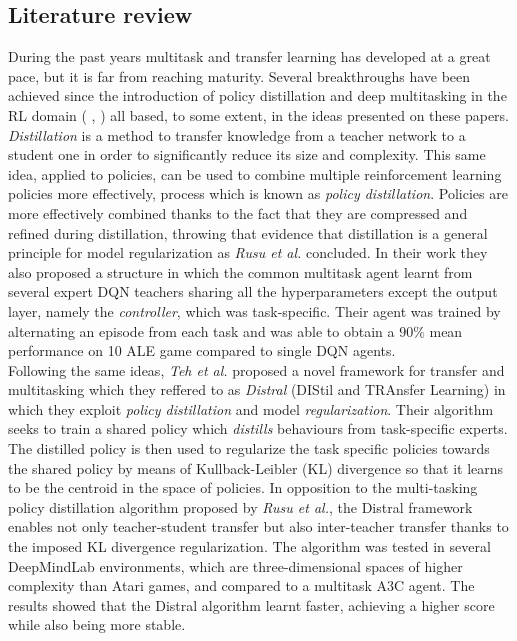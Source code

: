 \documentclass{article}
\begin{document}
\subsection{Literature review}
During the past years multitask and transfer learning has developed at a great pace, but it is far from reaching maturity. Several breakthroughs have been achieved since the introduction of policy distillation and deep multitasking in the RL domain ( \citep{RusuPOLICYDISTILLATION}, \citep{Parisotto2015Actor-Mimic:Learning})  all based, to some extent, in the ideas presented on these papers.\\
\newline
\textit{Distillation} is a method to transfer knowledge from a teacher network to a student one \citep{RusuPOLICYDISTILLATION} in order to significantly reduce its size and complexity. This same idea, applied to policies, can be used to combine multiple reinforcement learning policies more effectively, process which is known as \textit{policy distillation}. Policies are more effectively combined thanks to the fact that they are compressed and refined during distillation, throwing that evidence that distillation is a general principle for model regularization as \textit{Rusu et al.} concluded. In their work they also proposed a structure in which the common multitask agent learnt from several expert DQN teachers sharing all the hyperparameters except the output layer, namely the \textit{controller}, which was task-specific. Their agent was trained by alternating an episode from each task and was able to obtain a $90\%$ mean performance on 10 ALE game compared to single DQN agents.\\
\newline
Following the same ideas, \textit{Teh et al.} \citep{Teh2017Distral:Learning} proposed a novel framework for transfer and multitasking which they reffered to as \textit{Distral} (DIStil and TRAnsfer Learning) in which they exploit \textit{policy distillation} and model \textit{regularization}. Their algorithm seeks to train a shared policy which \textit{distills} behaviours from task-specific experts. The distilled policy is then used to regularize the task specific policies towards the shared policy by means of Kullback-Leibler (KL) divergence so that it learns to be the centroid in the space of policies. In opposition to the multi-tasking policy distillation algorithm proposed by \textit{Rusu et al.}, the Distral framework enables not only teacher-student transfer but also inter-teacher transfer thanks to the imposed KL divergence regularization. The algorithm was tested in several DeepMindLab environments, which are three-dimensional spaces of higher complexity than Atari games, and compared to a multitask A3C agent. The results showed that the Distral algorithm learnt faster, achieving a higher score while also being more stable.\\
\end{document}
